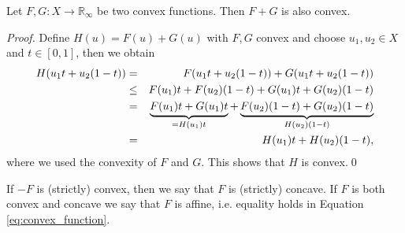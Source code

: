     \begin{proposition} %
        
        Let $F, G: X \longrightarrow \mathbb{R}_{\infty}$ be two convex functions. Then $F + G$ is also convex.

    \end{proposition}

    \begin{proof} %
        Define $H(u) = F(u) + G(u)$ with $F, G$ convex and choose $u_{1}, u_{2} \in X$ and $t \in [0, 1]$, then we obtain
        \begin{eqnarray}
            H(u_{1}t + u_{2}(1 - t)) &=& F(u_{1}t + u_{2}(1 - t)) + G(u_{1}t + u_{2}(1 - t)) \notag \\ 
            &\le& F(u_{1})t + F(u_{2})(1 - t) + G(u_{1})t + G(u_{2})(1 - t) \notag \\
            &=& \underbrace{F(u_{1})t + G(u_{1})t}_{= H(u_{1})t} + \underbrace{F(u_{2})(1 - t) + G(u_{2})(1 - t)}_{H(u_{2})(1 - t)} \notag \\
            &=& H(u_{1})t + H(u_{2})(1 - t), \notag
        \end{eqnarray}
        where we used the convexity of $F$ and $G$. This shows that $H$ is convex.\qed
    \end{proof}

    \begin{remark} %
        \label{rem:concave_function}

        If $-F$ is (strictly) convex, then we say that $F$ is (strictly) concave. If $F$ is both convex and concave we say that $F$ is affine, i.e. equality holds in Equation \ref{eq:convex_function}.

    \end{remark}

